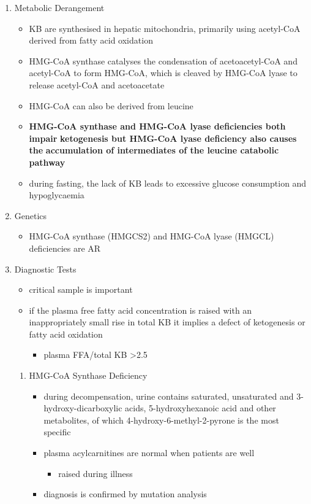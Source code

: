 \documentclass{scrartcl}
\begin{document}
\begin{enumerate}
\item Metabolic Derangement
\label{sec:orgbda3896}
\begin{itemize}
\item KB are synthesised in hepatic mitochondria, primarily using
acetyl-CoA derived from fatty acid oxidation
\item HMG-CoA synthase catalyses the condensation of acetoacetyl-CoA and
acetyl-CoA to form HMG-CoA, which is cleaved by HMG-CoA lyase to
release acetyl-CoA and acetoacetate
\item HMG-CoA can also be derived from leucine
\item \textbf{HMG-CoA synthase and HMG-CoA lyase deficiencies both impair}
\textbf{ketogenesis but HMG-CoA lyase deficiency also causes the}
\textbf{accumulation of intermediates of the leucine catabolic pathway}
\item during fasting, the lack of KB leads to excessive glucose
consumption and hypoglycaemia
\end{itemize}

\item Genetics
\label{sec:org9367c0c}
\begin{itemize}
\item HMG-CoA synthase (HMGCS2) and HMG-CoA lyase (HMGCL) deficiencies are
AR
\end{itemize}

\item Diagnostic Tests
\label{sec:org6c22d17}
\begin{itemize}
\item critical sample is important
\item if the plasma free fatty acid concentration is raised with an
inappropriately small rise in total KB it implies a defect of
ketogenesis or fatty acid oxidation 
\begin{itemize}
\item plasma FFA/total KB >2.5
\end{itemize}
\end{itemize}

\begin{enumerate}
\item HMG-CoA Synthase Deficiency
\label{sec:org223825a}
\begin{itemize}
\item during decompensation, urine contains saturated, unsaturated and
3-hydroxy-dicarboxylic acids, 5-hydroxyhexanoic acid and other
metabolites, of which 4-hydroxy-6-methyl-2-pyrone is the most
specific
\item plasma acylcarnitines are normal when patients are well
\begin{itemize}
\item raised during illness
\end{itemize}
\item diagnosis is confirmed by mutation analysis
\end{itemize}


\end{enumerate}
\end{enumerate}
\end{document}

